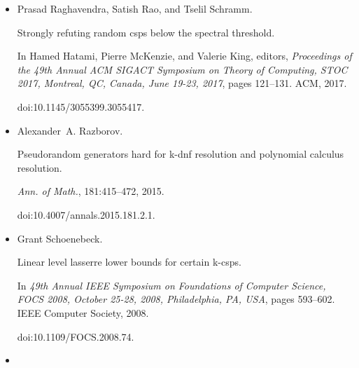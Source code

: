 \begin{itemize}
Shuo Pang.


Large clique is hard on average for resolution.


In Rahul Santhanam and Daniil Musatov, editors, \emph{Computer Science
- Theory and Applications - 16th International Computer Science Symposium in
Russia, CSR 2021, Sochi, Russia, June 28 - July 2, 2021, Proceedings},
volume 12730 of \emph{Lecture Notes in Computer Science}, pages 361–380.
Springer, 2021.


doi:10.1007/978-3-030-79416-3\_22.





\item[] 
[32]

Prasad Raghavendra, Satish Rao, and Tselil Schramm.


Strongly refuting random csps below the spectral threshold.


In Hamed Hatami, Pierre McKenzie, and Valerie King, editors, \emph{Proceedings of the 49th Annual ACM SIGACT Symposium on Theory of
Computing, STOC 2017, Montreal, QC, Canada, June 19-23, 2017}, pages
121–131. ACM, 2017.


doi:10.1145/3055399.3055417.





\item[] 
[33]

Alexander A. Razborov.


Pseudorandom generators hard for k-dnf resolution and polynomial
calculus resolution.


\emph{Ann. of Math.}, 181:415–472, 2015.


doi:10.4007/annals.2015.181.2.1.





\item[] 
[34]

Grant Schoenebeck.


Linear level lasserre lower bounds for certain k-csps.


In \emph{49th Annual IEEE Symposium on Foundations of Computer
Science, FOCS 2008, October 25-28, 2008, Philadelphia, PA, USA}, pages
593–602. IEEE Computer Society, 2008.


doi:10.1109/FOCS.2008.74.





\item[] 
[35]


\end{itemize}
